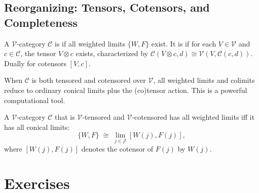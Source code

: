 \subsection{Reorganizing: Tensors, Cotensors, and Completeness}

A $\mathcal{V}$-category $\mathcal{C}$ is  if all
weighted limits $\{W, F\}$ exist. It is  if for
each $V \in \mathcal{V}$ and $c \in \mathcal{C}$, the tensor $V \otimes c$
exists, characterized by $\mathcal{C}(V \otimes c, d) \cong \mathcal{V}(V,
\mathcal{C}(c, d))$. Dually for cotensors $[V, c]$.

When $\mathcal{C}$ is both tensored and cotensored over $\mathcal{V}$, all
weighted limits and colimits reduce to ordinary conical limits plus the
(co)tensor action. This is a powerful computational tool.

\begin{theorem}
A $\mathcal{V}$-category $\mathcal{C}$ that is $\mathcal{V}$-tensored and
$\mathcal{V}$-cotensored has all weighted limits iff it has all conical limits:
\begin{equation*}
  \{W, F\} \;\cong\; \lim_{j \in \mathcal{J}} [W(j), F(j)],
\end{equation*}
where $[W(j), F(j)]$ denotes the cotensor of $F(j)$ by $W(j)$.
\end{theorem}


\section*{Exercises}

